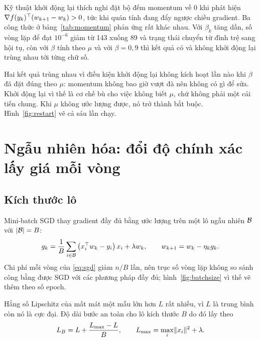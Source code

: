 \documentclass[12pt, a4paper, oneside]{report}
\theoremstyle{definition}
\begin{document}
Kỹ thuật khởi động lại thích nghi \cite{odonoghue2015adaptive} đặt bộ đếm
momentum về $0$ khi phát hiện
$\nabla f(y_k)^{\top} (w_{k+1} - w_k) > 0$, tức khi quán tính đang đẩy ngược chiều
gradient. Ba công thức ở bảng~\ref{tab:momentum} phản ứng rất khác nhau. Với $\beta_k$ tăng
dần, số vòng lặp để đạt $10^{-6}$ giảm từ 143
xuống 89 và trạng thái chuyển từ đình trệ sang hội tụ, còn với $\beta$ tính theo
$\mu$ và với $\beta = 0{,}9$ thì kết quả có và không khởi động lại trùng nhau tới
từng chữ số.

Hai kết quả trùng nhau vì điều kiện khởi động lại không kích hoạt lần nào khi
$\beta$ đã đặt đúng theo $\mu$: momentum không bao giờ vượt đà nên không có gì để
sửa. Khởi động lại vì thế là cơ chế bù cho việc không biết $\mu$, chứ không phải
một cải tiến chung. Khi $\mu$ không ước lượng được, nó trở
thành bắt buộc. Hình~\ref{fig:restart} vẽ cả sáu lần chạy.


\chapter{Ngẫu nhiên hóa: đổi độ chính xác lấy giá mỗi vòng}\label{ch:sgd}

\section{Kích thước lô}

Mini-batch SGD \cite{robbins1951stochastic, bottou2018optimization} thay gradient
đầy đủ bằng ước lượng trên một lô ngẫu nhiên $\mathcal{B}$ với $\lvert\mathcal{B}\rvert = B$:
\begin{equation}\label{eq:sgd}
  g_k = \frac{1}{B} \sum_{i \in \mathcal{B}} \left( x_i^{\top} w_k - y_i \right) x_i + \lambda w_k,
  \qquad w_{k+1} = w_k - \eta_k g_k .
\end{equation}
Chi phí mỗi vòng của \eqref{eq:sgd} giảm $n/B$ lần, nên trục số vòng lặp không so
sánh công bằng được SGD với các phương pháp đầy đủ; hình~\ref{fig:batchsize} vì
thế vẽ thêm theo số epoch.

Hằng số Lipschitz của mất mát một mẫu lớn hơn $L$ rất nhiều, vì $L$ là trung bình
còn nó là cực đại. Độ dài bước an toàn cho lô kích thước $B$ do đó lấy theo
\begin{equation}\label{eq:LB}
  L_{B} = L + \frac{L_{\max} - L}{B}, \qquad L_{\max} = \max_{i} \lVert x_i\rVert^{2} + \lambda .
\end{equation}
\end{document}
